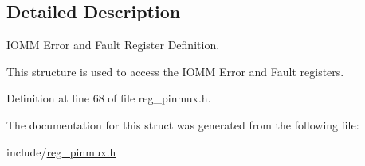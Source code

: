 \subsection{Detailed Description}
I\+O\+MM Error and Fault Register Definition. 

This structure is used to access the I\+O\+MM Error and Fault registers. 

Definition at line 68 of file reg\+\_\+pinmux.\+h.



The documentation for this struct was generated from the following file\+:\begin{DoxyCompactItemize}
\item 
include/\mbox{\hyperlink{reg__pinmux_8h}{reg\+\_\+pinmux.\+h}}\end{DoxyCompactItemize}
